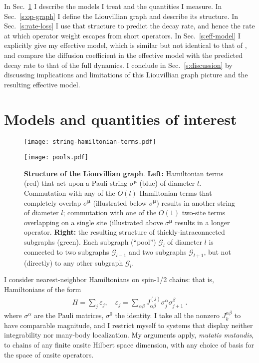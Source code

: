 \documentclass[aps,prb,nofootinbib,twocolumn,balancelastpage,amsmath,amssymb,floatfix,superscriptaddress,]{revtex4-1}
\newcommand{\pool}{\mathcal G}
\begin{document}
In Sec.~\ref{s:model} I describe the models I treat and the quantities I measure.
In Sec.~\ref{s:op-graph} I define the Liouvillian graph and describe its structure.
In Sec.~\ref{s:rate-loss} I use that structure to predict the decay rate, and hence the rate at which operator weight escapes from short operators.
In Sec.~\ref{s:eff-model} I explicitly give my effective model,
which is similar but not identical to that of ,
and compare the diffusion coefficient in the effective model with the predicted decay rate
to that of the full dynamics.
I conclude in Sec.~\ref{s:discussion} by discussing implications and limitations of this Liouvillian graph picture
and the resulting effective model.

\section{Models and quantities of interest}\label{s:model}


\begin{figure*}[t]
  \begin{minipage}{0.4\textwidth}
    \texttt{[image: string-hamiltonian-terms.pdf]}
  \end{minipage}\hskip 1cm
  \begin{minipage}{0.5\textwidth}
    \texttt{[image: pools.pdf]}
  \end{minipage}
  \caption{\textbf{Structure of the Liouvillian graph}.
    \textbf{Left:}
    Hamiltonian terms (red) that act upon
    a Pauli string $\sigma^{\bm \mu}$ (blue) of diameter $l$.
    Commutation with any of the $O(l)$ Hamiltonian terms that completely overlap $\sigma^{\bm \mu}$ (illustrated below $\sigma^{\bm \mu}$) results in another string of diameter $l$;
    commutation with one of the $O(1)$ two-site terms overlapping on a single site
    (illustrated above $\sigma^{\bm \mu}$ results in a longer operator.
    \textbf{Right:} the resulting structure of thickly-intraconnected subgraphs (green).
    Each subgraph (``pool'') $\pool_l$ of diameter $l$ is connected to two subgraphs $\pool_{l-1}$  and two subgraphs $\pool_{l+1}$, but not (directly) to any other subgraph $\pool_l$.
  }
  \label{fig:structure}
\end{figure*}

I consider nearest-neighbor Hamiltonians on spin-1/2 chains: that is, Hamiltonians of the form
\begin{align}
  \label{eq:nn-ham}
  H = \sum_{j} \varepsilon_j,\quad \varepsilon_j = \sum_{\alpha\beta} J^{(j)}_{\alpha\beta}\sigma_j^\alpha \sigma_{j+1}^\beta\;.
\end{align}
where $\sigma^\alpha$ are the Pauli matrices, $\sigma^0$ the identity.
I take all the nonzero $J^{\alpha\beta}_k$ to have comparable magnitude,
and I restrict myself to systems that display neither integrability nor many-body localization.
My arguments apply, \textit{mutatis mutandis}, to chains of any finite onsite Hilbert space dimension, with any choice of basis for the space of onsite operators.
\end{document}
